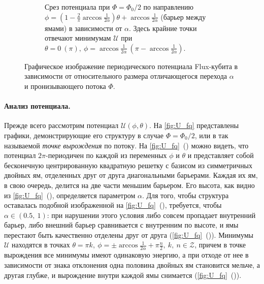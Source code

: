 \documentclass[12pt, twoside]{report}
\numberwithin{equation}{section}
\numberwithin{figure}{section}
\begin{document}
\begin{figure}[!p]
\begin{subfigure}[t]{0.49\linewidth}
\caption{Срез потенциала при $\Phi = \Phi_0/2$ по направлению $\phi = \left(1 - \frac{2}{\pi}\arccos
\frac{1}{2\alpha}\right)\theta+\arccos\frac{1}{2\alpha}$ (барьер между ямами) в зависимости от $\alpha$. Здесь крайние точки отвечают минимумам $\mathcal{U}$ при $\theta=0\ (\pi),\ \phi=\arccos
\frac{1}{2\alpha}\ \left(\pi - \arccos\frac{1}{2\alpha}\right)$.}
\label{fig:U_cut2}
\end{subfigure}
\endgroup
\caption{Графическое изображение периодического потенциала Flux-кубита в зависимости от относительного размера отличающегося перехода $\alpha$ и пронизывающего потока $\Phi$.}
\label{fig:U_fq}
\end{figure} 

\paragraph{Анализ потенциала.} Прежде всего рассмотрим потенциал $\mathcal{U}(\phi, \theta)$. На \autoref{fig:U_fq} представлены графики, демонстрирующие его структуру в случае $\Phi = \Phi_0/2$, или в так называемой \textit{точке вырождения} по потоку. На \autoref{fig:U_fq}~() можно видеть, что потенциал $2\pi$-периодичен по каждой из переменных $\phi$ и $\theta$ и представляет собой бесконечную центрированную квадратную решетку с базисом из симметричных двойных ям, отделенных друг от друга диагональными барьерами. Каждая их ям, в свою очередь, делится на две части меньшим барьером. Его высота, как видно из \autoref{fig:U_fq}~(), определяется параметром $\alpha$. Для того, чтобы структура оставалась подобной изображенной на \autoref{fig:U_fq}~(), требуется, чтобы $\alpha\in(0.5,\ 1)$: при нарушении этого условия либо совсем пропадает внутренний барьер, либо внешний барьер сравнивается с внутренним по высоте, и ямы перестают быть качественно отделены друг от друга (\autoref{fig:U_fq}~()). Минимумы $\mathcal{U}$ находятся в точках $\theta=\pi k,\ \phi=\pm\arccos\frac{1}{2\alpha}+\pi \frac{n}{2},\ k,\ n\in\mathcal{Z}$, причем в точке вырождения все минимумы имеют одинаковую энергию, а при отходе от нее в зависимости от знака отклонения одна половина двойных ям становится мельче, а другая глубже, и вырождение внутри каждой ямы снимается (\autoref{fig:U_fq}~()). 
\end{document}
